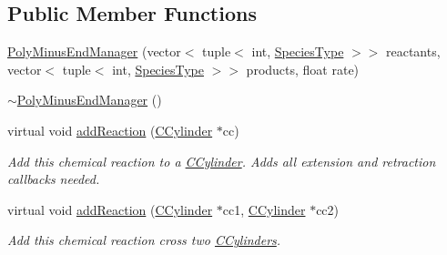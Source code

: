 \subsection*{Public Member Functions}
\begin{DoxyCompactItemize}
\item 
\hyperlink{classPolyMinusEndManager_a99748ff2c949a8e82cdea994fbdde203}{Poly\+Minus\+End\+Manager} (vector$<$ tuple$<$ int, \hyperlink{Species_8h_a50651af47c56ea0e27235468d23542cf}{Species\+Type} $>$$>$ reactants, vector$<$ tuple$<$ int, \hyperlink{Species_8h_a50651af47c56ea0e27235468d23542cf}{Species\+Type} $>$$>$ products, float rate)
\item 
\hyperlink{classPolyMinusEndManager_a9bc71f9b337d5621f42423b948b220a1}{$\sim$\+Poly\+Minus\+End\+Manager} ()
\item 
virtual void \hyperlink{classPolyMinusEndManager_a914c9cd90412261a70c36afdf35653d8}{add\+Reaction} (\hyperlink{classCCylinder}{C\+Cylinder} $\ast$cc)
\begin{DoxyCompactList}\small\item\em Add this chemical reaction to a \hyperlink{classCCylinder}{C\+Cylinder}. Adds all extension and retraction callbacks needed. \end{DoxyCompactList}\item 
virtual void \hyperlink{classPolyMinusEndManager_a164b26aa71eed7a920fd03e636d12dec}{add\+Reaction} (\hyperlink{classCCylinder}{C\+Cylinder} $\ast$cc1, \hyperlink{classCCylinder}{C\+Cylinder} $\ast$cc2)
\begin{DoxyCompactList}\small\item\em Add this chemical reaction cross two \hyperlink{classCCylinder}{C\+Cylinders}. \end{DoxyCompactList}\end{DoxyCompactItemize}
